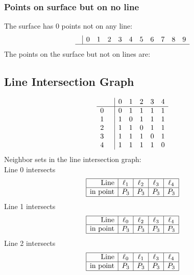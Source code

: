 \documentclass{article}
\begin{document}
{\subsubsection*{Points on surface but on no line}
The surface has 0 points not on any line:\\
$$
\begin{array}{r|*{10}{r}}
 & 0 & 1 & 2 & 3 & 4 & 5 & 6 & 7 & 8 & 9\\
\hline
\end{array}
$$
The points on the surface but not on lines are:\\
\begin{multicols}{2}
\noindent
\end{multicols}
\subsection*{Line Intersection Graph}
{\arraycolsep=1pt
$$
\begin{array}{rr|*{5}r}
 &  & 0 & 1 & 2 & 3 & 4\\
\hline
0 &  & 0 & 1 & 1 & 1 & 1\\
1 &  & 1 & 0 & 1 & 1 & 1\\
2 &  & 1 & 1 & 0 & 1 & 1\\
3 &  & 1 & 1 & 1 & 0 & 1\\
4 &  & 1 & 1 & 1 & 1 & 0\\
\end{array}
$$
}%
Neighbor sets in the line intersection graph:\\
Line 0 intersects 
$$
\begin{array}{|r*{4}{|c}|}
\hline
\mbox{Line}  & \ell_{1} & \ell_{2} & \ell_{3} & \ell_{4}\\
\hline
\mbox{in point}  & P_{3} & P_{3} & P_{3} & P_{3}\\
\hline
\end{array}
$$
Line 1 intersects 
$$
\begin{array}{|r*{4}{|c}|}
\hline
\mbox{Line}  & \ell_{0} & \ell_{2} & \ell_{3} & \ell_{4}\\
\hline
\mbox{in point}  & P_{3} & P_{3} & P_{3} & P_{3}\\
\hline
\end{array}
$$
Line 2 intersects 
$$
\begin{array}{|r*{4}{|c}|}
\hline
\mbox{Line}  & \ell_{0} & \ell_{1} & \ell_{3} & \ell_{4}\\
\hline
\mbox{in point}  & P_{3} & P_{3} & P_{3} & P_{3}\\
\hline
\end{array}
$$}
\end{document}
